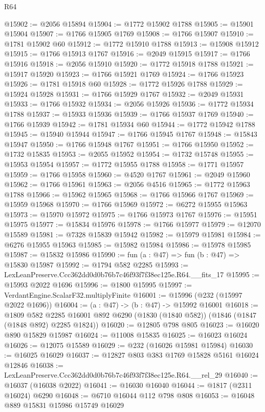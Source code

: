 \begin{lexlean}{R64}
\begin{coremodule}
@15902 := @2056 @15894
@15904 := @1772 @15902 @1788
@15905 := @15901 @15904
@15907 := @1766 @15905 @1769
@15908 := @1766 @15907
@15910 := @1781 @15902 @60
@15912 := @1772 @15910 @1788
@15913 := @15908 @15912
@15915 := @1766 @15913 @1767
@15916 := @2049 @15915
@15917 := @1766 @15916
@15918 := @2056 @15910
@15920 := @1772 @15918 @1788
@15921 := @15917 @15920
@15923 := @1766 @15921 @1769
@15924 := @1766 @15923
@15926 := @1781 @15918 @60
@15928 := @1772 @15926 @1788
@15929 := @15924 @15928
@15931 := @1766 @15929 @1767
@15932 := @2049 @15931
@15933 := @1766 @15932
@15934 := @2056 @15926
@15936 := @1772 @15934 @1788
@15937 := @15933 @15936
@15939 := @1766 @15937 @1769
@15940 := @1766 @15939
@15942 := @1781 @15934 @60
@15944 := @1772 @15942 @1788
@15945 := @15940 @15944
@15947 := @1766 @15945 @1767
@15948 := @15843 @15947
@15950 := @1766 @15948 @1767
@15951 := @1766 @15950
@15952 := @1732 @15835
@15953 := @2055 @15952
@15954 := @1732 @15748
@15955 := @15953 @15954
@15957 := @1772 @15955 @1788
@15958 := @1771 @15957
@15959 := @1766 @15958
@15960 := @4520 @1767
@15961 := @2049 @15960
@15962 := @1766 @15961
@15963 := @2056 @4516
@15965 := @1772 @15963 @1788
@15966 := @15962 @15965
@15968 := @1766 @15966 @1767
@15969 := @15959 @15968
@15970 := @1766 @15969
@15972 := @6272 @15955 @15963
@15973 := @15970 @15972
@15975 := @1766 @15973 @1767
@15976 := @15951 @15975
@15977 := @15834 @15976
@15978 := @1766 @15977
@15979 := @12070 @15589
@15981 := @7328 @15839 @15942
@15982 := @15979 @15981
@15984 := @6276 @15955 @15963
@15985 := @15982 @15984
@15986 := @15978 @15985
@15987 := @15832 @15986
@15990 := fun (a : @47) => fun (b : @47) => @15830 @15987
@15992 := @1794 @582 @2285
@15993 := LexLeanPreserve.Ccc362dd0d0b76b7c46f93f7f38ec125e.R64.__fits_17
@15995 := @15993 @2022 @1696
@15996 := @1800 @15995
@15997 := VerdantEngine.ScalarF32.multiplyFinite
@16001 := @15996 (@232 (@15997 @2022 @1696))
@16004 := (a : @47) -> (b : @47) -> @15992 @16001
@16018 := @1809
    @582
    @2285
    @16001
    @892
    @6290
    (@1830 (@1840 @582))
    (@1846 (@1847 (@1848 @892) @2285 @1824))
@16020 := @12805 @798 @805
@16023 := @16020 @890 @15829 @15987
@16024 := @11008 @15835
@16025 := @16023 @16024
@16026 := @12075 @15589
@16029 := @232 (@16026 @15981 @15984)
@16030 := @16025 @16029
@16037 := @12827 @803 @383 @1769 @15828 @5161 @16024 @12846
@16038 := LexLeanPreserve.Ccc362dd0d0b76b7c46f93f7f38ec125e.R64.__rel_29
@16040 := @16037 (@16038 @2022)
@16041 := @16030 @16040
@16044 := @1817 (@2311 @16024) @6290
@16048 := @6710 @16044 @112 @798 @808
@16053 := @16048 @889 @15831 @15986 @15749 @16029

\end{coremodule}
\end{lexlean}
